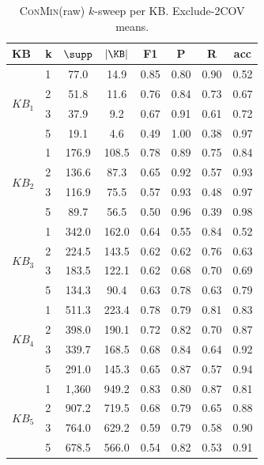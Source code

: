 \begin{table}[t]
\centering
\small
\setlength{\tabcolsep}{4pt}
\begin{tabular}{llcccccc}
\toprule
KB & k & $\supp$ & $|\KB|$ & F1 & P & R & acc \tabularnewline
\midrule
\multirow{4}{*}{$KB_{1}$} & 1 & 77.0 & 14.9 & 0.85 & 0.80 & 0.90 & 0.52 \tabularnewline
 & 2 & 51.8 & 11.6 & 0.76 & 0.84 & 0.73 & 0.67 \tabularnewline
 & 3 & 37.9 & 9.2 & 0.67 & 0.91 & 0.61 & 0.72 \tabularnewline
 & 5 & 19.1 & 4.6 & 0.49 & 1.00 & 0.38 & 0.97 \tabularnewline
\midrule
\multirow{4}{*}{$KB_{2}$} & 1 & 176.9 & 108.5 & 0.78 & 0.89 & 0.75 & 0.84 \tabularnewline
 & 2 & 136.6 & 87.3 & 0.65 & 0.92 & 0.57 & 0.93 \tabularnewline
 & 3 & 116.9 & 75.5 & 0.57 & 0.93 & 0.48 & 0.97 \tabularnewline
 & 5 & 89.7 & 56.5 & 0.50 & 0.96 & 0.39 & 0.98 \tabularnewline
\midrule
\multirow{4}{*}{$KB_{3}$} & 1 & 342.0 & 162.0 & 0.64 & 0.55 & 0.84 & 0.52 \tabularnewline
 & 2 & 224.5 & 143.5 & 0.62 & 0.62 & 0.76 & 0.63 \tabularnewline
 & 3 & 183.5 & 122.1 & 0.62 & 0.68 & 0.70 & 0.69 \tabularnewline
 & 5 & 134.3 & 90.4 & 0.63 & 0.78 & 0.63 & 0.79 \tabularnewline
\midrule
\multirow{4}{*}{$KB_{4}$} & 1 & 511.3 & 223.4 & 0.78 & 0.79 & 0.81 & 0.83 \tabularnewline
 & 2 & 398.0 & 190.1 & 0.72 & 0.82 & 0.70 & 0.87 \tabularnewline
 & 3 & 339.7 & 168.5 & 0.68 & 0.84 & 0.64 & 0.92 \tabularnewline
 & 5 & 291.0 & 145.3 & 0.65 & 0.87 & 0.57 & 0.94 \tabularnewline
\midrule
\multirow{4}{*}{$KB_{5}$} & 1 & 1,360 & 949.2 & 0.83 & 0.80 & 0.87 & 0.81 \tabularnewline
 & 2 & 907.2 & 719.5 & 0.68 & 0.79 & 0.65 & 0.88 \tabularnewline
 & 3 & 764.0 & 629.2 & 0.59 & 0.79 & 0.58 & 0.90 \tabularnewline
 & 5 & 678.5 & 566.0 & 0.54 & 0.82 & 0.53 & 0.91 \tabularnewline
\bottomrule
\end{tabular}
\caption{\textsc{ConMin}(raw) $k$-sweep per KB. Exclude-2COV means.}
\label{tab:app-ksweep}
\end{table}

